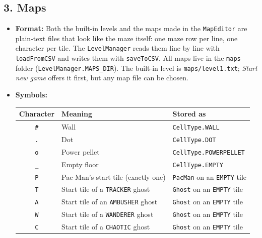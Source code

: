 \documentclass[11pt, a4paper]{article}
\begin{document}
\subsection*{3. Maps}
\label{sec:custom_maps}
\begin{itemize}
    \item \textbf{Format:} Both the built-in levels and the maps made in the \texttt{MapEditor} are plain-text files that look like the maze itself: one maze row per line, one character per tile. The \texttt{LevelManager} reads them line by line with \texttt{loadFromCSV} and writes them with \texttt{saveToCSV}. All maps live in the \texttt{maps} folder (\texttt{LevelManager.MAPS\_DIR}). The built-in level is \texttt{maps/level1.txt}; \textit{Start new game} offers it first, but any map file can be chosen.
    \item \textbf{Symbols:}

    \vspace{0.2cm}
    \begin{tabular}{@{}cll@{}}
        \toprule
        \textbf{Character} & \textbf{Meaning} & \textbf{Stored as} \\
        \midrule
        \texttt{\#} & Wall & \texttt{CellType.WALL} \\
        \texttt{.} & Dot & \texttt{CellType.DOT} \\
        \texttt{o} & Power pellet & \texttt{CellType.POWERPELLET} \\
        \texttt{\_} & Empty floor & \texttt{CellType.EMPTY} \\
        \texttt{P} & Pac-Man's start tile (exactly one) & \texttt{PacMan} on an \texttt{EMPTY} tile \\
        \texttt{T} & Start tile of a \texttt{TRACKER} ghost & \texttt{Ghost} on an \texttt{EMPTY} tile \\
        \texttt{A} & Start tile of an \texttt{AMBUSHER} ghost & \texttt{Ghost} on an \texttt{EMPTY} tile \\
        \texttt{W} & Start tile of a \texttt{WANDERER} ghost & \texttt{Ghost} on an \texttt{EMPTY} tile \\
        \texttt{C} & Start tile of a \texttt{CHAOTIC} ghost & \texttt{Ghost} on an \texttt{EMPTY} tile \\
        \bottomrule
    \end{tabular}
    \vspace{0.2cm}


\end{itemize}
\end{document}
